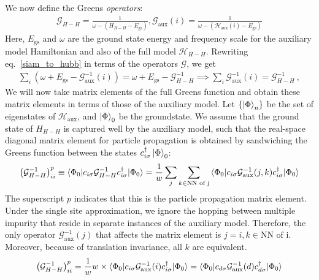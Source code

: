\documentclass{report}
\numberwithin{equation}{section}
\begin{document}
We now define the Greens {\it operators}:
\begin{equation}\begin{aligned}
	\mathcal{G}_{H-H} = \frac{1}{\omega - \left(H_{H-H} - E_\text{gs}\right) }, \mathcal{G}_\text{aux}(i) = \frac{1}{\omega - \left(\mathcal{H}_\text{aux}(i) - E_\text{gs}\right)}
\end{aligned}\end{equation}
Here, \(E_\text{gs}\) and \(\omega\) are the ground state energy and frequency scale for the auxiliary model Hamiltonian and also of the full model \(\mathcal{H}_{H-H}\). Rewriting eq.~\ref{siam_to_hubb} in terms of the operators \(\mathcal{G}\), we get
\begin{equation}\begin{aligned}
\sum_i \left(\omega + E_\text{gs} - \mathcal{G}^{-1}_\text{aux}(i)\right) = \omega + E_\text{gs} - \mathcal{G}^{-1}_{H-H} \implies \sum_i \mathcal{G}^{-1}_\text{aux}(i) = \mathcal{G}^{-1}_{H-H}~,
\end{aligned}\end{equation}
We will now take matrix elements of the full Greens function and obtain these matrix elements in terms of those of the auxiliary model. Let \(\left\{ \ket{\Phi}_n \right\} \) be the set of eigenstates of \(\mathcal{H}_\text{aux}\), and \(\ket{\Phi}_0\) be the groundstate. We assume that the ground state of \(H_{H-H}\) is captured well by the auxiliary model, such that the real-space diagonal matrix element for particle propagation is obtained by sandwiching the Greens function between the states \(c^\dagger_{i\sigma}\ket{\Phi}_0\):
\begin{equation}\begin{aligned}
	\left(\mathcal{G}^{-1}_{H-H}\right)^p_{ii} \equiv \braket{\Phi_0 | c_{i\sigma} \mathcal{G}^{-1}_{H-H} c^\dagger_{i\sigma} | \Phi_0} = \frac{1}{w}\sum_j \sum_{k \in \text{NN of j}}\braket{\Phi_0 | c_{i\sigma} \mathcal{G}^{-1}_\text{aux}(j,k) c^\dagger_{i\sigma} | \Phi_0}
\end{aligned}\end{equation}
The superscript \(p\) indicates that this is the particle propagation matrix element.
Under the single site approximation, we ignore the hopping between multiple impurity that reside in separate instances of the auxiliary model. Therefore, the only operator \(\mathcal{G}^{-1}_\text{aux}(j)\) that affects the matrix element is \(j=i, k \in \text{NN of i}\). Moreover, because of translation invariance, all \(k\) are equivalent.
\begin{equation}\begin{aligned}
	\left(\mathcal{G}^{-1}_{H-H}\right)^p_{ii} = \frac{1}{w} w\times \braket{\Phi_0 | c_{i\sigma} \mathcal{G}^{-1}_\text{aux}(i) c^\dagger_{i\sigma} | \Phi_0} = \braket{\Phi_0 | c_{d\sigma} \mathcal{G}^{-1}_\text{aux}(d) c^\dagger_{d\sigma} | \Phi_0}
\end{aligned}\end{equation}
\end{document}
